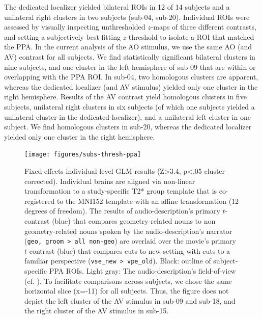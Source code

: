 \documentclass[english]{article}
\begin{document}
The dedicated localizer \citep{sengupta2016extension} yielded bilateral ROIs in
12 of 14 subjects and a unilateral right clusters in two subjects (sub-04,
sub-20).
Individual ROIs were assessed by visually inspecting unthresholded $z$-maps of
three different contrasts, and setting a subjectively best fitting $z$-threshold
to isolate a ROI that matched the PPA.
In the current analysis of the AO stimulus, we use the same AO (and AV) contrast
for all subjects. We find statistically significant bilateral clusters in nine
subjects, and one cluster in the left hemisphere of sub-09 that are within or
overlapping with the PPA ROI.
In sub-04, two homologous clusters are apparent, whereas the dedicated localizer
(and AV stimulus) yielded only one cluster in the right hemisphere.
Results of the AV contrast yield homologous clusters in five subjects,
unilateral right clusters in six subjects (of which one subjects yielded a
unilateral cluster in the dedicated localizer), and a unilateral left cluster in
one subject.
We find homologous clusters in sub-20, whereas the dedicated localizer yielded
only one cluster in the right hemisphere.


\begin{figure} \centering
    \texttt{[image: figures/subs-thresh-ppa]}
    \caption{Fixed-effects individual-level GLM results (Z>3.4, p<.05
        cluster-corrected).
        Individual brains are aligned via non-linear
        transformation to a study-specific T2* group template that is
        co-registered to the MNI152 template with an affine transformation (12
        degrees of freedom).
        The results of audio-description's primary
        $t$-contrast (blue) that compares geometry-related nouns to non
        geometry-related nouns spoken by the audio-description's narrator
        (\texttt{geo, groom > all non-geo}) are overlaid over the movie's
        primary $t$-contrast (blue) that compares cuts to new setting with cuts
        to a familiar perspective (\texttt{vse\_new > vpe\_old}).
        Black:
        outline of subject-specific PPA ROIs.
        Light gray: The
        audio-description's field-of-view (cf. \citep{hanke2014audiomovie}).
        To facilitate comparisons across subjects, we chose the same horizontal
        slice (x=-11) for all subjects. Thus, the figure does not depict the
        left cluster of the AV stimulus in sub-09 and sub-18, and the right
        cluster of the AV stimulus in sub-15.}
    \label{fig:subs-thresh-ppa}
\end{figure}
\end{document}
